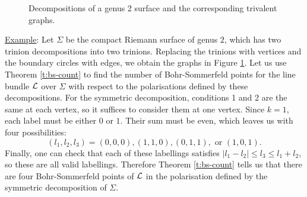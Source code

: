 	\begin{figure}[h]
		\centering
		\label{fig:g2-graphs}
		\hspace{0.1\linewidth}
		\caption{Decompositions of a genus 2 surface and the corresponding trivalent graphs.}
	\end{figure}

	\underline{Example}:
	Let $\Sigma$ be the compact Riemann surface of genus $2$, which has two trinion decompositions into two trinions. Replacing the trinions with vertices and the boundary circles with edges, we obtain the graphs in Figure \ref{fig:g2-graphs}. Let us use Theorem \ref{t:bs-count} to find the number of Bohr-Sommerfeld points for the line bundle $\mathcal{L}$ over $\Sigma$ with respect to the polarisations defined by these decompositions. For the symmetric decomposition, conditions 1 and 2 are the same at each vertex, so it suffices to consider them at one vertex. Since $k=1$, each label must be either $0$ or $1$. Their sum must be even, which leaves us with four possibilities:
	\begin{equation}
		(l_1, l_2, l_3) = (0,0,0), (1,1,0), (0,1,1), \text{ or } (1,0,1).
	\end{equation}
	Finally, one can check that each of these labellings satisfies $|l_1-l_2| \leq l_3 \leq l_1+l_2$, so these are all valid labellings. Therefore Theorem \ref{t:bs-count} tells us that there are four Bohr-Sommerfeld points of $\mathcal{L}$ in the polarisation defined by the symmetric decomposition of $\Sigma$.
	
